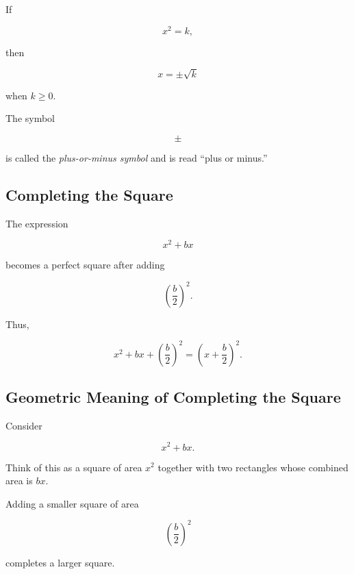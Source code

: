 If

\[ x^2=k, \]

then

\[ x=\pm\sqrt{k} \]

when \(k\geq0\).

The symbol

\[ \pm \]

is called the \emph{plus-or-minus symbol} and is read ``plus or minus.''

\subsection{Completing the Square}
\label{subsec:completing-square}

The expression

\[ x^2+bx \]

becomes a perfect square after adding

\[ \left(\frac b2\right)^2. \]

Thus,

\[ x^2+bx+\left(\frac b2\right)^2
=\left(x+\frac b2\right)^2. \]

\subsection{Geometric Meaning of Completing the Square}
\label{subsec:geometric-completing-square}

Consider

\[ x^2+bx. \]

Think of this as a square of area \(x^2\) together with two rectangles whose
combined area is \(bx\).

Adding a smaller square of area

\[ \left(\frac b2\right)^2 \]

completes a larger square.

\begin{center}
\end{center}


